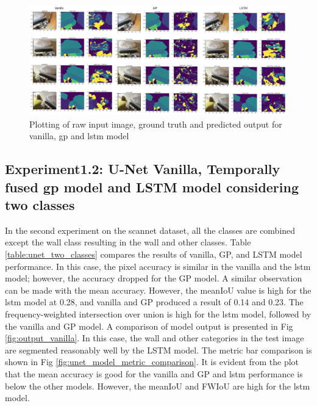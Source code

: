 	\begin{figure}
		\centering
		\includegraphics[width=16cm]{images/unet_scannet_all_classes.png}
		\caption{Plotting of raw input image, ground truth and predicted output for vanilla, gp and lstm model}
		\label{fig:unet_model}
	\end{figure}

	\newpage
		
    \subsection{Experiment1.2: U-Net Vanilla, Temporally fused gp model and LSTM model considering two classes}
	In the second experiment on the scannet dataset, all the classes are combined except the wall class resulting in the wall and other classes. Table \ref{table:unet_two_classes} compares the results of vanilla, GP, and LSTM model performance. In this case, the pixel accuracy is similar in the vanilla and the lstm model; however, the accuracy dropped for the GP model. A similar observation can be made with the mean accuracy. However, the meanIoU value is high for the lstm model at 0.28, and vanilla and GP produced a result of 0.14 and 0.23. The frequency-weighted intersection over union is high for the lstm model, followed by the vanilla and GP model. A comparison of model output is presented in Fig \ref{fig:output_vanilla}. In this case, the wall and other categories in the test image are segmented reasonably well by the LSTM model. The metric bar comparison is shown in Fig \ref{fig:unet_model_metric_comparison}. It is evident from the plot that the mean accuracy is good for the vanilla and GP and lstm performance is below the other models. However, the meanIoU and FWIoU are high for the lstm model.


